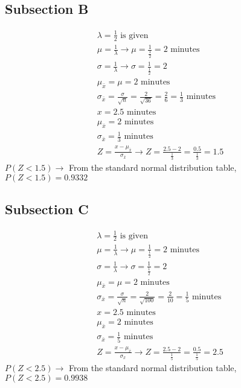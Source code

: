 \documentclass[a4paper,11pt]{article}
\theoremstyle{mytheor}
\begin{document}
\subsection{Subsection B}
$$
\begin{aligned}
& \lambda=\frac{1}{2} \text { is given } \\
& \mu=\frac{1}{\lambda} \rightarrow \mu=\frac{1}{\frac{1}{2}}=2 \text { minutes } \\
& \sigma=\frac{1}{\lambda} \rightarrow \sigma=\frac{1}{\frac{1}{2}}=2\\
& \mu_{\bar{x}}=\mu=2 \text { minutes } \\
& \sigma_{\bar{x}}=\frac{\sigma}{\sqrt{n}}=\frac{2}{\sqrt{36}}=\frac{2}{6}=\frac{1}{3} \text { minutes } \\
& x=2.5 \text { minutes } \\
& \mu_{\bar{x}}=2 \text { minutes } \\
& \sigma_{\bar{x}}=\frac{1}{3} \text { minutes } \\
& Z=\frac{x-\mu_{\bar{x}}}{\sigma_{\bar{x}}} \rightarrow Z=\frac{2.5-2}{\frac{1}{3}}=\frac{0.5}{\frac{1}{3}}=1.5
\end{aligned}
$$
$P(Z<1.5) \rightarrow$ From the standard normal distribution table, $P(Z<1.5)=0.9332$

\subsection{Subsection C}
$$
\begin{aligned}
& \lambda=\frac{1}{2} \text { is given } \\
& \mu=\frac{1}{\lambda} \rightarrow \mu=\frac{1}{\frac{1}{2}}=2 \text { minutes } \\
& \sigma=\frac{1}{\lambda} \rightarrow \sigma=\frac{1}{\frac{1}{2}}=2\\
& \mu_{\bar{x}}=\mu=2 \text { minutes } \\
& \sigma_{\bar{x}}=\frac{\sigma}{\sqrt{n}}=\frac{2}{\sqrt{100}}=\frac{2}{10}=\frac{1}{5} \text { minutes } \\
& x=2.5 \text { minutes } \\
& \mu_{\bar{x}}=2 \text { minutes } \\
& \sigma_{\bar{x}}=\frac{1}{5} \text { minutes } \\
& Z=\frac{x-\mu_{\bar{x}}}{\sigma_{\bar{x}}} \rightarrow Z=\frac{2.5-2}{\frac{1}{5}}=\frac{0.5}{\frac{1}{5}}=2.5
\end{aligned}
$$
$P(Z<2.5) \rightarrow$ From the standard normal distribution table, $P(Z<2.5)=0.9938 $
\end{document}
